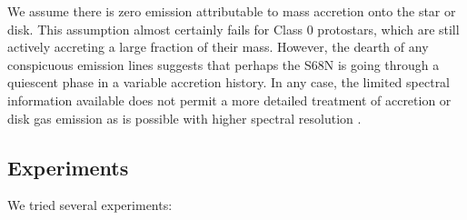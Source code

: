 \documentclass[twocolumn]{emulateapj}%
\begin{document}
We assume there is zero emission attributable to mass accretion onto the star or disk.  This assumption almost certainly fails for Class 0 protostars, which are still actively accreting a large fraction of their mass.  However, the dearth of any conspicuous emission lines suggests that perhaps the S68N is going through a quiescent phase in a variable accretion history.  In any case, the limited spectral information available does not permit a more detailed treatment of accretion or disk gas emission as is possible with higher spectral resolution \citep[\emph{e.g.}]{2016ApJ...826..179L}.  



\subsection{Experiments}
 We tried several experiments:
\end{document}
